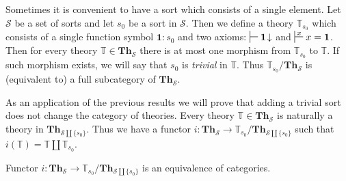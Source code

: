 \documentclass{elsarticle}
\theoremstyle{definition}
\theoremstyle{remark}
\newcommand{\cat}[1]{\mathbf{#1}}
\newcommand{\Th}{\cat{Th}}
\newcommand{\emptyCtx}{\mathbf{1}}
\numberwithin{figure}{section}
\begin{document}
Sometimes it is convenient to have a sort which consists of a single element.
Let $\mathcal{S}$ be a set of sorts and let $s_0$ be a sort in $\mathcal{S}$.
Then we define a theory $\mathbb{T}_{s_0}$ which consists of a single function symbol $\emptyCtx : s_0$
    and two axioms: $\sststile{}{} \emptyCtx\!\downarrow$ and $\sststile{}{x} x = \emptyCtx$.
Then for every theory $\mathbb{T} \in \Th_\mathcal{S}$ there is at most one morphism from $\mathbb{T}_{s_0}$ to $\mathbb{T}$.
If such morphism exists, we will say that $s_0$ is \emph{trivial} in $\mathbb{T}$.
Thus $\mathbb{T}_{s_0}/\Th_\mathcal{S}$ is (equivalent to) a full subcategory of $\Th_\mathcal{S}$.

As an application of the previous results we will prove that adding a trivial sort does not change the category of theories.
Every theory $\mathbb{T} \in \Th_\mathcal{S}$ is naturally a theory in $\Th_{\mathcal{S} \amalg \{ s_0 \}}$.
Thus we have a functor $i : \Th_\mathcal{S} \to \mathbb{T}_{s_0}/\Th_{\mathcal{S} \amalg \{ s_0 \}}$ such that $i(\mathbb{T}) = \mathbb{T} \amalg \mathbb{T}_{s_0}$.
\begin{prop}
Functor $i : \Th_\mathcal{S} \to \mathbb{T}_{s_0}/\Th_{\mathcal{S} \amalg \{ s_0 \}}$ is an equivalence of categories.
\end{prop}
\end{document}
